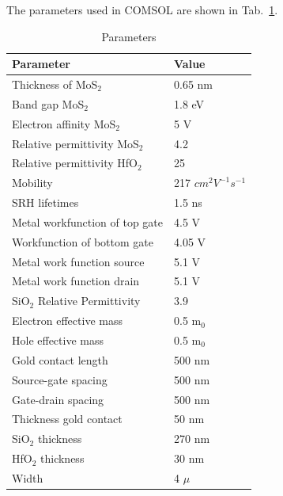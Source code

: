 \documentclass[12pt,a4paper,titlepage]{article}
\begin{document}
The parameters used in COMSOL are shown in Tab.~\ref{table:HfO2}.
\begin{table}[H]
	\centering
	\begin{tabular}{l l}
		\toprule
		\textbf{Parameter}             & \textbf{Value}       \\
		\midrule 
		Thickness of MoS$_2$           & 0.65 nm              \\ 
		Band gap MoS$_2$               & 1.8 eV               \\ 
		Electron affinity MoS$_2$      & 5 V                  \\ 
		Relative permittivity MoS$_2$  & 4.2                  \\ 
		Relative permittivity HfO$_2$  & 25                   \\ 
		Mobility                       & 217 $cm^2V^{-1}s^{-1}$ \\ 
		SRH lifetimes                  & 1.5 ns               \\ 
		Metal workfunction of top gate & 4.5 V                \\ 
		Workfunction of bottom gate    & 4.05 V               \\ 
		Metal work function source     & 5.1 V                \\ 
		Metal work function drain      & 5.1 V                \\ 
		SiO$_2$ Relative Permittivity  & 3.9                  \\ 
		Electron effective mass        & 0.5 m$_0$            \\ 
		Hole effective mass            & 0.5 m$_0$            \\ 
		Gold contact length            & 500 nm               \\ 
		Source-gate spacing            & 500 nm               \\ 
		Gate-drain spacing             & 500 nm               \\ 
		Thickness gold contact         & 50 nm                \\ 
		SiO$_2$ thickness              & 270 nm               \\ 
		HfO$_2$ thickness              & 30 nm               \\ 
		Width                          & 4 $\mu$              \\
		\bottomrule
	\end{tabular}
	\caption{Parameters}
	\label{table:HfO2}
\end{table}
\end{document}
